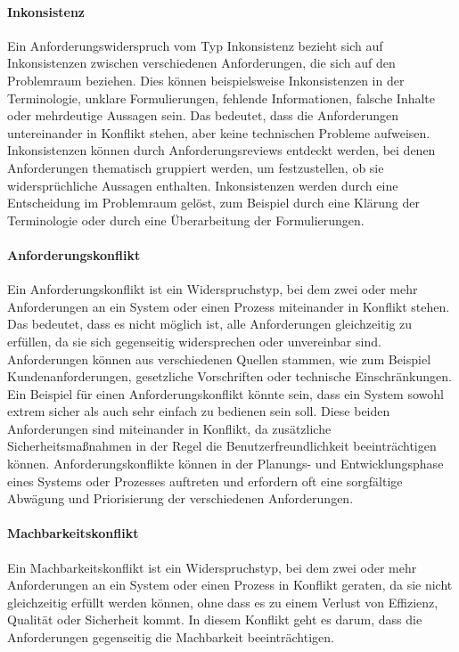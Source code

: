\paragraph{Inkonsistenz}
Ein Anforderungswiderspruch vom Typ Inkonsistenz bezieht sich auf Inkonsistenzen zwischen verschiedenen Anforderungen,
die sich auf den Problemraum beziehen.
Dies können beispielsweise Inkonsistenzen in der Terminologie, unklare Formulierungen,
fehlende Informationen, falsche Inhalte oder mehrdeutige Aussagen sein.
Das bedeutet, dass die Anforderungen untereinander in Konflikt stehen, aber keine technischen Probleme aufweisen.
Inkonsistenzen können durch Anforderungsreviews entdeckt werden, bei denen Anforderungen thematisch gruppiert werden,
um festzustellen, ob sie widersprüchliche Aussagen enthalten.
Inkonsistenzen werden durch eine Entscheidung im Problemraum gelöst,
zum Beispiel durch eine Klärung der Terminologie oder durch eine Überarbeitung der Formulierungen.\autocite[vgl.][S.235]{Herrmann.2022}

\paragraph{Anforderungskonflikt}
Ein Anforderungskonflikt ist ein Widerspruchstyp,
bei dem zwei oder mehr Anforderungen an ein System oder einen Prozess miteinander in Konflikt stehen.
Das bedeutet, dass es nicht möglich ist, alle Anforderungen gleichzeitig zu erfüllen,
da sie sich gegenseitig widersprechen oder unvereinbar sind.
Anforderungen können aus verschiedenen Quellen stammen, wie zum Beispiel Kundenanforderungen,
gesetzliche Vorschriften oder technische Einschränkungen.
Ein Beispiel für einen Anforderungskonflikt könnte sein,
dass ein System sowohl extrem sicher als auch sehr einfach zu bedienen sein soll.
Diese beiden Anforderungen sind miteinander in Konflikt,
da zusätzliche Sicherheitsmaßnahmen in der Regel die Benutzerfreundlichkeit beeinträchtigen können.
Anforderungskonflikte können in der Planungs- und Entwicklungsphase eines Systems oder Prozesses auftreten
und erfordern oft eine sorgfältige Abwägung und Priorisierung der verschiedenen Anforderungen.

\paragraph{Machbarkeitskonflikt}
Ein Machbarkeitskonflikt ist ein Widerspruchstyp,
bei dem zwei oder mehr Anforderungen an ein System oder einen Prozess in Konflikt geraten,
da sie nicht gleichzeitig erfüllt werden können,
ohne dass es zu einem Verlust von Effizienz, Qualität oder Sicherheit kommt.
In diesem Konflikt geht es darum, dass die Anforderungen gegenseitig die Machbarkeit beeinträchtigen.

